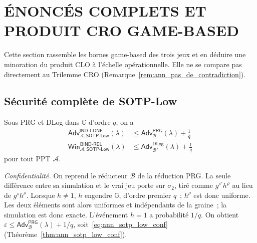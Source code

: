 \section{\'ENONC\'ES COMPLETS ET PRODUIT CRO GAME-BASED}
\label{sec:gamebased_produitCRO}
\begin{sloppypar}

Cette section rassemble les bornes game-based des trois jeux et en d\'eduire une
minoration du produit CLO \`a l'\'echelle op\'erationnelle. Elle ne se compare pas
directement au Trilemme CRO (Remarque~\ref{rem:ann_pas_de_contradiction}).

\subsection{S\'ecurit\'e compl\`ete de SOTP-Low}

\begin{theorem}\label{thm:ann_sotp_low_games}
Sous PRG et DLog dans $\mathbb{G}$ d'ordre $q$, on a
\begin{align}
\mathsf{Adv}^{\mathsf{IND\text{-}CONF}}_{\mathcal{A},\mathsf{SOTP\text{-}Low}}(\lambda)
&\leq \mathsf{Adv}^{\mathsf{PRG}}_{\mathcal{B}}(\lambda)
    + \frac{1}{q}
\label{eq:ann_sotp_low_conf} \\[4pt]
\mathsf{Win}^{\mathsf{BIND\text{-}REL}}_{\mathcal{A},\mathsf{SOTP\text{-}Low}}(\lambda)
&\leq \mathsf{Adv}^{\mathsf{DLog}}_{\mathcal{B}'}(\lambda)
    + \frac{1}{q}
\label{eq:ann_sotp_low_rel}
\end{align}
pour tout PPT $\mathcal{A}$.
\end{theorem}

\begin{Preuve}
\emph{Confidentialit\'e.} On reprend le r\'educteur $\mathcal{B}$ de la r\'eduction PRG.
La seule diff\'erence entre sa simulation et le vrai jeu porte sur $\sigma_2$, tir\'e
comme $g^{s'}h^{\rho}$ au lieu de $g^{s}h^{\rho}$. Lorsque $h \neq 1$, $h$ engendre
$\mathbb{G}$, d'ordre premier $q$~; $h^\rho$ est donc uniforme. Les deux \'el\'ements sont
alors uniformes et ind\'ependants de la graine~; la simulation est donc
exacte. L'\'ev\'enement $h = 1$ a probabilit\'e $1/q$. On obtient
$\varepsilon \leq \mathsf{Adv}^{\mathsf{PRG}}_{\mathcal{B}}(\lambda) + 1/q$, soit~\eqref{eq:ann_sotp_low_conf}
(Th\'eor\`eme~\ref{thm:ann_sotp_low_conf}).


\end{Preuve}
\end{sloppypar}

